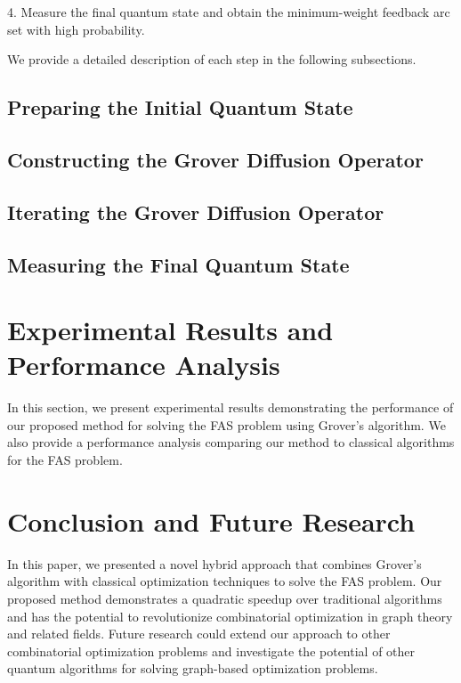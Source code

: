 4. Measure the final quantum state and obtain the minimum-weight feedback arc set with high probability.

We provide a detailed description of each step in the following subsections.

\subsection{Preparing the Initial Quantum State}

\subsection{Constructing the Grover Diffusion Operator}

\subsection{Iterating the Grover Diffusion Operator}

\subsection{Measuring the Final Quantum State}

\section{Experimental Results and Performance Analysis}
\label{sec:results}

In this section, we present experimental results demonstrating the performance of our proposed method for solving the FAS problem using Grover's algorithm. We also provide a performance analysis comparing our method to classical algorithms for the FAS problem.

\section{Conclusion and Future Research}
\label{sec:conclusion}

In this paper, we presented a novel hybrid approach that combines Grover's algorithm with classical optimization techniques to solve the FAS problem. Our proposed method demonstrates a quadratic speedup over traditional algorithms and has the potential to revolutionize combinatorial optimization in graph theory and related fields. Future research could extend our approach to other combinatorial optimization problems and investigate the potential of other quantum algorithms for solving graph-based optimization problems.

